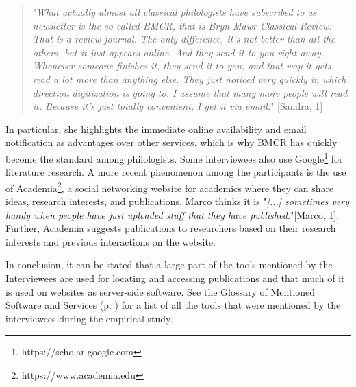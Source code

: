 \documentclass[12pt, a4paper, titlepage, oneside, abstract=true, toc=listof, toc=bibliography, BCOR=1cm]{scrreprt}
\begin{document}
\begin{quotation}
"\textit{What actually almost all classical philologists have subscribed to as newsletter is the so-called BMCR, that is Bryn Mawr Classical Review. That is a review journal. The only difference, it's not better than all the others, but it just appears online. And they send it to you right away. Whenever someone finishes it, they send it to you, and that way it gets read a lot more than anything else. They just noticed very quickly in which direction digitization is going to. I assume that many more people will read it. Because it's just totally convenient, I get it via email.}" [Sandra, 1]
\end{quotation}

In particular, she highlights the immediate online availability and email notification as advantages over other services, which is why BMCR has quickly become the standard among philologists. %
Some interviewees also use \gls{Google}\footnote{https://scholar.google.com} for literature research. 
A more recent phenomenon among the participants is the use of \gls{Academia}\footnote{https://www.academia.edu}, a social networking website for academics where they can share ideas, research interests, and publications. Marco thinks it is "\textit{[...] sometimes very handy when people have just uploaded stuff that they have published.}"[Marco, 1]. Further, Academia suggests publications to researchers based on their research interests and previous interactions on the website.

In conclusion, it can be stated that a large part of the tools mentioned by the Interviewees are used for locating and accessing publications and that much of it is used on websites as server-side software. See the Glossary of Mentioned Software and Services (p. \pageref{sec:glossary}) for a list of all the tools that were mentioned by the interviewees during the empirical study.
\end{document}
